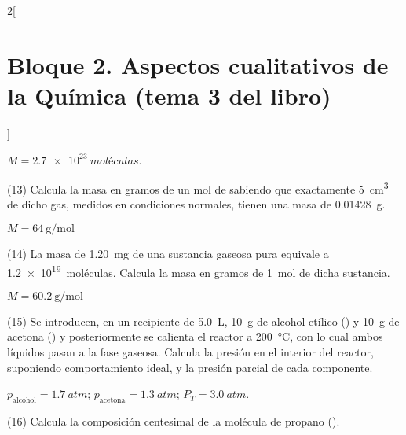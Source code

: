 \documentclass[10pt]{article}
\begin{document}
\begin{multicols}{2}[
    \section{Bloque 2. Aspectos cualitativos de la Química (tema 3 del libro)}
  ]
\begin{solution}
  \( M = \SI{2,7e23}{moléculas} \).
\end{solution}




\begin{exercise}[
    tags    = {},
    topics  = {química,química básica},
    source  = {FQ 1B MGH 2016, p71, e13},
  ]
  (13) Calcula la masa en gramos de un mol de  sabiendo que
  exactamente \SI{5}{\cubic\centi\meter} de dicho gas, medidos en condiciones
  normales, tienen una masa de \SI{0,01428}{\gram}.
\end{exercise}

\begin{solution}
  \( M = \SI{64}{\gram\per\mole} \)
\end{solution}




\begin{exercise}[
    tags    = {},
    topics  = {química,química básica},
    source  = {FQ 1B MGH 2016, p71, e14},
  ]
  (14) La masa de \SI{1,20}{\milli\gram} de una sustancia gaseosa pura equivale
  a \SI{1,2e19}{moléculas}. Calcula la masa en gramos de \SI{1}{\mole} de dicha sustancia.
\end{exercise}

\begin{solution}
  \( M = \SI{60,2}{\gram\per\mole} \)
\end{solution}




\begin{exercise}[
    tags    = {},
    topics  = {química,química básica},
    source  = {FQ 1B MGH 2016, p72, e15},
  ]
  (15) Se introducen, en un recipiente de \SI{5.0}{\liter}, \SI{10}{\gram} de alcohol etílico () y \SI{10}{\gram} de acetona () y posteriormente se calienta el reactor a \SI{200}{\celsius}, con lo cual ambos líquidos pasan a la fase gaseosa. Calcula la presión en el interior del reactor, suponiendo comportamiento ideal, y la presión parcial de cada componente.
\end{exercise}

\begin{solution}
  \( p_\textrm{alcohol} = \SI{1.7}{atm} \);
  \( p_\textrm{acetona} = \SI{1.3}{atm} \);
  \( P_T = \SI{3.0}{atm} \).
\end{solution}




\begin{exercise}[
    tags    = {},
    topics  = {química,química básica},
    source  = {FQ 1B MGH 2016, p74, e16},
  ]
  (16) Calcula la composición centesimal de la molécula de propano ().
\end{exercise}


\end{multicols}
\end{document}
